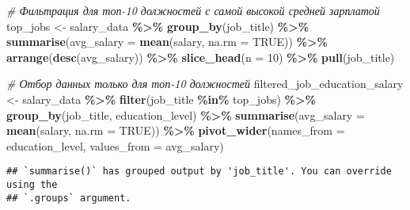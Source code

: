 \documentclass[
]{article}
\newenvironment{Shaded}{\begin{snugshade}}{\end{snugshade}}
\newcommand{\AttributeTok}[1]{\textcolor[rgb]{0.13,0.29,0.53}{#1}}
\newcommand{\CommentTok}[1]{\textcolor[rgb]{0.56,0.35,0.01}{\textit{#1}}}
\newcommand{\ConstantTok}[1]{\textcolor[rgb]{0.56,0.35,0.01}{#1}}
\newcommand{\DecValTok}[1]{\textcolor[rgb]{0.00,0.00,0.81}{#1}}
\newcommand{\FunctionTok}[1]{\textcolor[rgb]{0.13,0.29,0.53}{\textbf{#1}}}
\newcommand{\NormalTok}[1]{#1}
\newcommand{\OtherTok}[1]{\textcolor[rgb]{0.56,0.35,0.01}{#1}}
\newcommand{\SpecialCharTok}[1]{\textcolor[rgb]{0.81,0.36,0.00}{\textbf{#1}}}
\begin{document}
\begin{Shaded}
\begin{Highlighting}[]
\CommentTok{\# Фильтрация для топ{-}10 должностей с самой высокой средней зарплатой}
\NormalTok{top\_jobs }\OtherTok{\textless{}{-}}\NormalTok{ salary\_data }\SpecialCharTok{\%\textgreater{}\%}
  \FunctionTok{group\_by}\NormalTok{(job\_title) }\SpecialCharTok{\%\textgreater{}\%}
  \FunctionTok{summarise}\NormalTok{(}\AttributeTok{avg\_salary =} \FunctionTok{mean}\NormalTok{(salary, }\AttributeTok{na.rm =} \ConstantTok{TRUE}\NormalTok{)) }\SpecialCharTok{\%\textgreater{}\%}
  \FunctionTok{arrange}\NormalTok{(}\FunctionTok{desc}\NormalTok{(avg\_salary)) }\SpecialCharTok{\%\textgreater{}\%}
  \FunctionTok{slice\_head}\NormalTok{(}\AttributeTok{n =} \DecValTok{10}\NormalTok{) }\SpecialCharTok{\%\textgreater{}\%}
  \FunctionTok{pull}\NormalTok{(job\_title)}

\CommentTok{\# Отбор данных только для топ{-}10 должностей}
\NormalTok{filtered\_job\_education\_salary }\OtherTok{\textless{}{-}}\NormalTok{ salary\_data }\SpecialCharTok{\%\textgreater{}\%}
  \FunctionTok{filter}\NormalTok{(job\_title }\SpecialCharTok{\%in\%}\NormalTok{ top\_jobs) }\SpecialCharTok{\%\textgreater{}\%}
  \FunctionTok{group\_by}\NormalTok{(job\_title, education\_level) }\SpecialCharTok{\%\textgreater{}\%}
  \FunctionTok{summarise}\NormalTok{(}\AttributeTok{avg\_salary =} \FunctionTok{mean}\NormalTok{(salary, }\AttributeTok{na.rm =} \ConstantTok{TRUE}\NormalTok{)) }\SpecialCharTok{\%\textgreater{}\%}
  \FunctionTok{pivot\_wider}\NormalTok{(}\AttributeTok{names\_from =}\NormalTok{ education\_level, }\AttributeTok{values\_from =}\NormalTok{ avg\_salary)}
\end{Highlighting}
\end{Shaded}

\begin{verbatim}
## `summarise()` has grouped output by 'job_title'. You can override using the
## `.groups` argument.
\end{verbatim}
\end{document}
